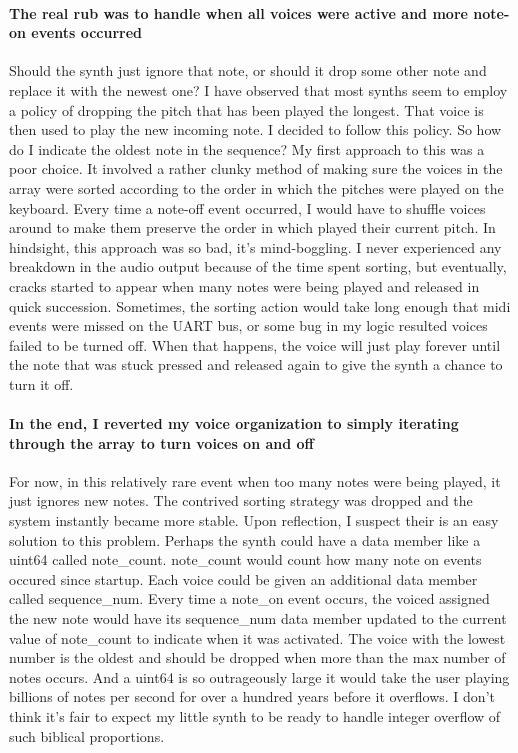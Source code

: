 \documentclass[acmlarge,screen]{acmart}
\begin{document}
	\paragraph{The real rub was to handle when all voices were active and more note-on events occurred} Should the synth just ignore that note, or should it drop some other note and replace it with the newest one? I have observed that most synths seem to employ a policy of dropping the pitch that has been played the longest. That voice is then used to play the new incoming note. I decided to follow this policy. So how do I indicate the oldest note in the sequence?  My first approach to this was a poor choice. It involved a rather clunky method of making sure the voices in the array were sorted according to the order in which the pitches were played on the keyboard. Every time a note-off event occurred, I would have to shuffle voices around to make them preserve the order in which played their current pitch. In hindsight, this approach was so bad, it's mind-boggling. I never experienced any breakdown in the audio output because of the time spent sorting, but eventually, cracks started to appear when many notes were being played and released in quick succession. Sometimes, the sorting action would take long enough that midi events were missed on the UART bus, or some bug in my logic resulted voices failed to be turned off. When that happens, the voice will just play forever until the note that was stuck pressed and released again to give the synth a chance to turn it off.

	\paragraph{In the end, I reverted my voice organization to simply iterating through the array to turn voices on and off} For now, in this relatively rare event when too many notes were being played, it just ignores new notes. The contrived sorting strategy was dropped and the system instantly became more stable. Upon reflection, I suspect their is an easy solution to this problem. Perhaps the synth could have a data member like a uint64 called note\_count. note\_count would count how many note on events occured since startup. Each voice could be given an additional data member called sequence\_num. Every time a note\_on event occurs, the voiced assigned the new note would have its sequence\_num data member updated to the current value of note\_count to indicate when it was activated. The voice with the lowest number is the oldest and should be dropped when more than the max number of notes occurs. And a uint64 is so outrageously large it would take the user playing billions of notes per second for over a hundred years before it overflows. I don't think it's fair to expect my little synth to be ready to handle integer overflow of such biblical proportions.
\end{document}
